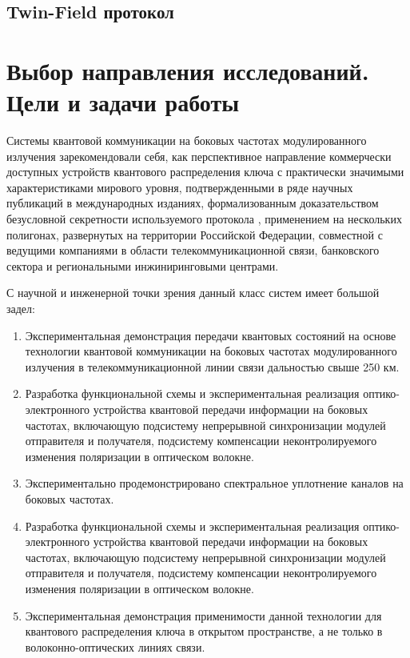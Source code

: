 \subsection{Twin-Field протокол} \label{subsec:ch1/sec7/sub4}



\section{Выбор направления исследований. Цели и задачи работы} \label{sec:ch1/sec8}

Системы квантовой коммуникации на боковых частотах модулированного излучения зарекомендовали себя, как перспективное направление коммерчески доступных устройств квантового распределения ключа с практически значимыми характеристиками мирового уровня, подтвержденными в ряде научных публикаций в международных изданиях, формализованным доказательством безусловной секретности используемого протокола , применением на нескольких полигонах, развернутых на территории Российской Федерации, совместной с ведущими компаниями в области телекоммуникационной связи, банковского сектора и региональными инжиниринговыми центрами. 


С научной и инженерной точки зрения данный класс систем имеет большой задел:

\begin{enumerate}
	\item Экспериментальная демонстрация передачи квантовых состояний на основе технологии квантовой коммуникации на боковых частотах модулированного излучения в телекоммуникационной линии связи дальностью свыше 250 км. 
	\item Разработка функциональной схемы и экспериментальная реализация оптико-электронного устройства квантовой передачи информации на боковых частотах, включающую подсистему непрерывной синхронизации модулей отправителя и получателя, подсистему компенсации неконтролируемого изменения поляризации в оптическом волокне.
	\item Экспериментально продемонстрировано спектральное уплотнение каналов на боковых частотах. 
	\item Разработка функциональной схемы и экспериментальная реализация оптико-электронного устройства квантовой передачи информации на боковых частотах, включающую подсистему непрерывной синхронизации модулей отправителя и получателя, подсистему компенсации неконтролируемого изменения поляризации в оптическом волокне.
	\item Экспериментальная демонстрация применимости данной технологии для квантового распределения ключа в открытом пространстве, а не только в волоконно-оптических линиях связи. 
\end{enumerate}


